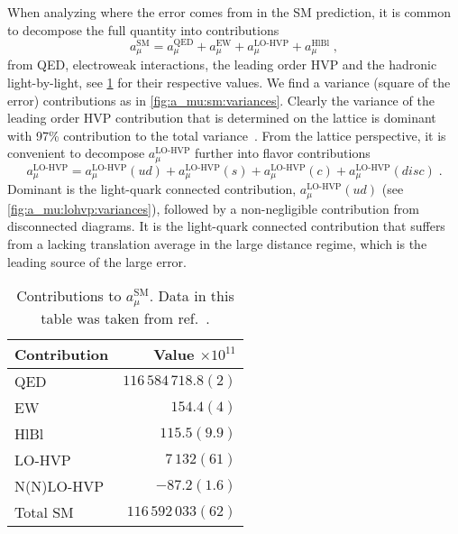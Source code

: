 When analyzing where the error comes from in the SM prediction, it is common to decompose the full quantity into contributions
\begin{equation}
a_{\mu}^{\text{SM}} = a_{\mu}^{\text{QED}} + a_{\mu}^{\text{EW}} + a_{\mu}^{\text{LO-HVP}} + a_{\mu}^{\text{HlBl}} \;,
\end{equation}
from QED, electroweak interactions, the leading order HVP and the hadronic light-by-light, see \cref{tab:a:mu:contributions} for their respective values.
We find a variance (square of the error) contributions as in \cref{fig:a_mu:sm:variances}.
Clearly the variance of the leading order HVP contribution that is determined on the lattice is dominant with 97\% contribution to the total variance~\cite{snowmass:2025}.
From the lattice perspective, it is convenient to decompose $a_{\mu}^{\text{LO-HVP}}$ further into flavor contributions
\begin{equation} \label{eq:a:mu:lohvp:quarks}
a_{\mu}^{\text{LO-HVP}} = a_{\mu}^{\text{LO-HVP}}(ud) + a_{\mu}^{\text{LO-HVP}}(s) + a_{\mu}^{\text{LO-HVP}}(c) + a_{\mu}^{\text{LO-HVP}}(disc) \;.
\end{equation}
Dominant is the light-quark connected contribution, $a_{\mu}^{\text{LO-HVP}}(ud)$ (see \cref{fig:a_mu:lohvp:variances}), followed by a non-negligible contribution from disconnected diagrams.
It is the light-quark connected contribution that suffers from a lacking translation average in the large distance regime, which is the leading source of the large error.
\begin{table}
\begin{tabular}{lr}
\toprule
Contribution & Value $\times 10^{11}$  \\
\midrule
QED         & $116\, 584\, 718.8(2)$   \\
EW          & $154.4(4)$               \\
HlBl        & $115.5(9.9)$             \\
LO-HVP      & $7\, 132(61)$            \\
N(N)LO-HVP  & $-87.2(1.6)$             \\
\midrule
Total SM    & $116\, 592\, 033(62)$    \\
\bottomrule
\end{tabular}
\caption{
\label{tab:a:mu:contributions}
Contributions to $a_{\mu}^{\text{SM}}$.
Data in this table was taken from ref.~\cite{snowmass:2025}.
}
\end{table}

